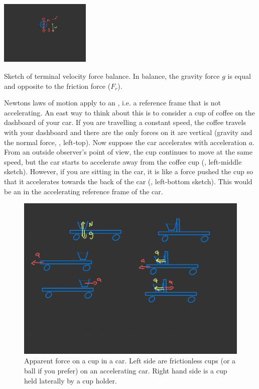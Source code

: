 \begin{marginfigure}
    \includegraphics[width=1.7in]{figs/Coriolis/TermVel}
    \caption{Sketch of terminal velocity force balance.  In balance, the gravity force $g$ is equal and opposite to the friction force ($F_r$).}
    \label{fig:TermVel}
\end{marginfigure}

Newtons laws of motion apply to an , i.e. a reference frame that is not accelerating.  An east way to think about this is to consider a cup of coffee on the dashboard of your car.  If you are travelling a constant speed, the coffee travels with your dashboard and there are the only forces on it are vertical (gravity and the normal force, , left-top).  Now suppose the car accelerates with acceleration $a$.  From an outside observer's point of view, the cup continues to move at the same speed, but the car starts to accelerate away from the coffee cup (, left-middle sketch). However, if you are sitting in the car, it is like a force pushed the cup so that it accelerates towards the back of the car (, left-bottom sketch). This would be an  in the accelerating reference frame of the car.


\begin{figure}[hbt]
  \begin{center}
  \includegraphics{figs/Coriolis/SketchApparent}
    \caption{Apparent force on a cup in a car.  Left side are frictionless cups (or a ball if you prefer) on an accelerating car.  Right hand side is a cup held laterally by a cup holder.}
    \label{fig:SketchApparent}  
  \end{center}
\end{figure}

